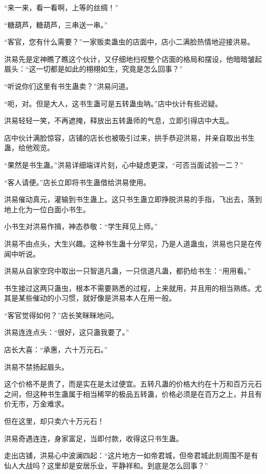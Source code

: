 
\begin{this_body}

“来一来，看一看啊，上等的丝绸！”

“糖葫芦，糖葫芦，三串送一串。”

“客官，您有什么需要？”一家贩卖蛊虫的店面中，店小二满脸热情地迎接洪易。

洪易先是定神瞧了瞧这个伙计，又仔细地扫视整个店面的格局和摆设，他暗暗皱起眉头：“这一切都是如此的栩栩如生，究竟是怎么回事？”

“听说你们这里有书生蛊卖？”洪易问道。

“呃，对。但是大人，这书生蛊可是五转蛊虫呐。”店中伙计有些迟疑。

洪易轻轻一笑，不再遮掩，释放出五转蛊师的气息，立即引得店中大乱。

店中伙计满脸惊容，店铺的店长也被吸引过来，拱手恭迎洪易，并亲自取出书生蛊，给他观览。

“果然是书生蛊。”洪易详细端详片刻，心中疑虑更深，“可否当面试验一二？”

“客人请便。”店长立即将书生蛊借给洪易使用。

洪易催动真元，灌输到书生蛊上。这只书生蛊立即挣脱洪易的手指，飞出去，落到地上化为一位白面小书生。

小书生对洪易作揖，神态恭敬：“学生拜见上师。”

洪易不由点头，大生兴趣。这种书生蛊十分罕见，乃是人道蛊虫，洪易也只是在传闻中听说。

洪易从自家空窍中取出一只智道凡蛊，一只信道凡蛊，都扔给书生：“用用看。”

书生接过这两只蛊虫，根本不需要熟悉的过程，上来就用，并且用的相当熟练。尤其是某些催动的小习惯，就好像是洪易本人在用一般。

“客官觉得如何？”店长笑眯眯地问。

洪易连连点头：“很好，这只蛊我要了。”

店长大喜：“承惠，六十万元石。”

洪易不禁扬起眉头。

这个价格不是贵了，而是实在是太过便宜。五转凡蛊的价格大约在十万和百万元石之间，但这种书生蛊属于相当稀罕的极品五转蛊，价格必须是在百万之上，并且有价无市，万金难求。

但在这里，却只卖六十万元石！

洪易奇遇连连，身家富足，当即付款，收得这只书生蛊。

走出店铺，洪易心中波澜四起：“这片地方一如帝君城，但帝君城此刻周围不是有仙人大战吗？这里却是安居乐业，平静祥和。到底是怎么回事？”


\end{this_body}
